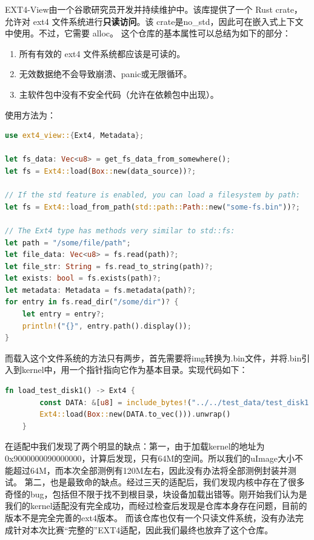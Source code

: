 EXT4-View由一个谷歌研究员开发并持续维护中。该库提供了一个 Rust crate，允许对 ext4 文件系统进行\textbf{只读访问}。该 crate是no_std，因此可在嵌入式上下文中使用。不过，它需要 alloc。
这个仓库的基本属性可以总结为如下的部分：
\begin{enumerate}
    \item 所有有效的 ext4 文件系统都应该是可读的。
    \item 无效数据绝不会导致崩溃、panic或无限循环。
    \item 主软件包中没有不安全代码（允许在依赖包中出现）。
\end{enumerate}
使用方法为：
\begin{lstlisting}[language={Rust}, caption={ext4-view在kernel中的基本使用方法示例}]
use ext4_view::{Ext4, Metadata};

let fs_data: Vec<u8> = get_fs_data_from_somewhere();
let fs = Ext4::load(Box::new(data_source))?;

// If the std feature is enabled, you can load a filesystem by path:
let fs = Ext4::load_from_path(std::path::Path::new("some-fs.bin"))?;

// The Ext4 type has methods very similar to std::fs:
let path = "/some/file/path";
let file_data: Vec<u8> = fs.read(path)?;
let file_str: String = fs.read_to_string(path)?;
let exists: bool = fs.exists(path)?;
let metadata: Metadata = fs.metadata(path)?;
for entry in fs.read_dir("/some/dir")? {
    let entry = entry?;
    println!("{}", entry.path().display());
}
    \end{lstlisting}

而载入这个文件系统的方法只有两步，首先需要将img转换为.bin文件，并将.bin引入到kernel中，用一个指针指向它作为基本目录。实现代码如下：
\begin{lstlisting}[language={Rust}, caption={将测例加载进入kernel}]
    fn load_test_disk1() -> Ext4 {
        const DATA: &[u8] = include_bytes!("../../test_data/test_disk1.bin");
        Ext4::load(Box::new(DATA.to_vec())).unwrap()
    }

\end{lstlisting}

在适配中我们发现了两个明显的缺点：第一，由于加载kernel的地址为0x9000000090000000，计算后发现，只有64M的空间。所以我们的uImage大小不能超过64M，而本次全部测例有120M左右，因此没有办法将全部测例封装并测试。
第二，也是最致命的缺点。经过三天的适配后，我们发现内核中存在了很多奇怪的bug，包括但不限于找不到根目录，块设备加载出错等。刚开始我们认为是我们的kernel适配没有完全成功，而经过检查后发现是仓库本身存在问题，目前的版本不是完全完善的ext4版本。
而该仓库也仅有一个只读文件系统，没有办法完成针对本次比赛“完整的”EXT4适配，因此我们最终也放弃了这个仓库。

